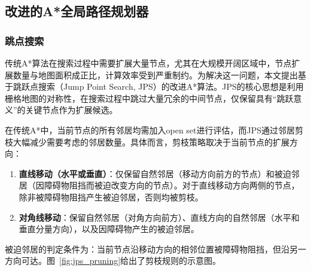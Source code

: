 \documentclass[lettersize,journal]{IEEEtran}
\begin{document}
\subsection{改进的A*全局路径规划器}

\label{subsec:jps}

\subsubsection{跳点搜索}

传统A*算法在搜索过程中需要扩展大量节点，尤其在大规模开阔区域中，节点扩展数量与地图面积成正比，计算效率受到严重制约。为解决这一问题，本文提出基于跳跃点搜索（Jump Point Search, JPS）的改进A*算法\cite{ref11,ref12}。JPS的核心思想是利用栅格地图的对称性，在搜索过程中跳过大量冗余的中间节点，仅保留具有``跳跃意义''的关键节点作为扩展候选。

在传统A*中，当前节点的所有邻居均需加入open set进行评估，而JPS通过邻居剪枝大幅减少需要考虑的邻居数量。具体而言，剪枝策略取决于当前节点的扩展方向：

\begin{enumerate}

\item \textbf{直线移动（水平或垂直）}：仅保留自然邻居（移动方向前方的节点）和被迫邻居（因障碍物阻挡而被迫改变方向的节点）。对于直线移动方向两侧的节点，除非被障碍物阻挡产生被迫邻居，否则均被剪枝。

\item \textbf{对角线移动}：保留自然邻居（对角方向前方）、直线方向的自然邻居（水平和垂直分量方向），以及因障碍物产生的被迫邻居。

\end{enumerate}

被迫邻居的判定条件为：当前节点沿移动方向的相邻位置被障碍物阻挡，但沿另一方向可达。图~\ref{fig:jps_pruning}给出了剪枝规则的示意图。
\end{document}
